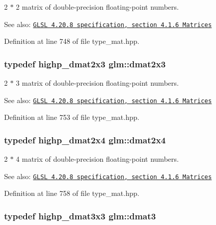 2 $\ast$ 2 matrix of double-precision floating-point numbers.

\begin{Desc}
\item[See also:]\href{http://www.opengl.org/registry/doc/GLSLangSpec.4.20.8.pdf}{\tt GLSL 4.20.8 specification, section 4.1.6 Matrices} \end{Desc}


Definition at line 748 of file type\_\-mat.hpp.\hypertarget{group__core__types_g6b5ff9888ca0e468f35b637d4c3a361d}{
\subsubsection[dmat2x3]{\setlength{\rightskip}{0pt plus 5cm}typedef highp\_\-dmat2x3 {\bf glm::dmat2x3}}}
\label{group__core__types_g6b5ff9888ca0e468f35b637d4c3a361d}


2 $\ast$ 3 matrix of double-precision floating-point numbers.

\begin{Desc}
\item[See also:]\href{http://www.opengl.org/registry/doc/GLSLangSpec.4.20.8.pdf}{\tt GLSL 4.20.8 specification, section 4.1.6 Matrices} \end{Desc}


Definition at line 753 of file type\_\-mat.hpp.\hypertarget{group__core__types_g2d1dd4b4925d1ea67539902c820483a0}{
\subsubsection[dmat2x4]{\setlength{\rightskip}{0pt plus 5cm}typedef highp\_\-dmat2x4 {\bf glm::dmat2x4}}}
\label{group__core__types_g2d1dd4b4925d1ea67539902c820483a0}


2 $\ast$ 4 matrix of double-precision floating-point numbers.

\begin{Desc}
\item[See also:]\href{http://www.opengl.org/registry/doc/GLSLangSpec.4.20.8.pdf}{\tt GLSL 4.20.8 specification, section 4.1.6 Matrices} \end{Desc}


Definition at line 758 of file type\_\-mat.hpp.\hypertarget{group__core__types_g25fd62195c3ef5ac0d32ead1dbfbb929}{
\subsubsection[dmat3]{\setlength{\rightskip}{0pt plus 5cm}typedef highp\_\-dmat3x3 {\bf glm::dmat3}}}
\label{group__core__types_g25fd62195c3ef5ac0d32ead1dbfbb929}


